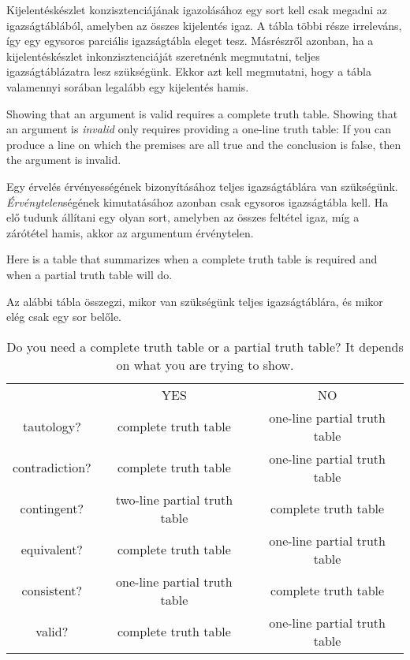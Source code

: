 Kijelentéskészlet konzisztenciájának igazolásához egy sort kell csak megadni az igazságtáblából, amelyben az összes kijelentés igaz. A tábla többi része irreleváns, így egy egysoros parciális igazságtábla eleget tesz. Másrészről azonban, ha a kijelentéskészlet inkonzisztenciáját szeretnénk megmutatni, teljes igazságtáblázatra lesz szükségünk. Ekkor azt kell megmutatni, hogy a tábla valamennyi sorában legalább egy kijelentés hamis.

Showing that an argument is valid requires a complete truth table. Showing that an argument is \emph{invalid} only requires providing a one-line truth table: If you can produce a line on which the premises are all true and the conclusion is false, then the argument is invalid.

Egy érvelés érvényességének bizonyításához teljes igazságtáblára van szükségünk. \emph{Érvénytelen}ségének kimutatásához azonban csak egysoros igazságtábla kell. Ha elő tudunk állítani egy olyan sort, amelyben az összes feltétel igaz, míg a zárótétel hamis, akkor az argumentum érvénytelen.

Here is a table that summarizes when a complete truth table is required and when a partial truth table will do.

Az alábbi tábla összegzi, mikor van szükségünk teljes igazságtáblára, és mikor elég csak egy sor belőle.

\begin{table}[h!]
\begin{center}
\begin{tabular}{c|c|c|}
\cline{2-3}
 & YES & NO\\
\cline{2-3}
tautology? & complete truth table & one-line partial truth table\\
contradiction? &  complete truth table  & one-line partial truth table\\
contingent? & two-line partial truth table & complete truth table\\
equivalent? & complete truth table & one-line partial truth table\\
consistent? & one-line partial truth table & complete truth table\\
valid? & complete truth table & one-line partial truth table\\
\cline{2-3}
\end{tabular}
\end{center}
\caption{Do you need a complete truth table or a partial truth table? It depends on what you are trying to show.}
\label{table.CompleteVsPartial}
\end{table}

